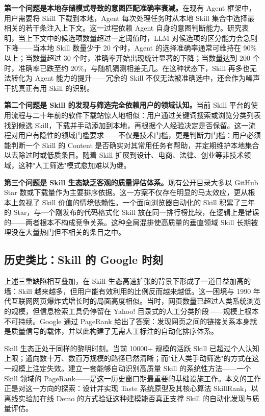 \textbf{第一个问题是本地存储模式导致的意图匹配准确率衰减。}在现有 Agent 框架中，用户需要将 Skill 下载到本地，Agent 每次处理任务时从本地 Skill 集合中选择最相关的若干条注入上下文。这一过程依赖 Agent 自身的意图判断能力。研究表明\cite{liu2024lostinthemiddle}，当上下文中的候选项数量超过一定阈值时，LLM 对候选项的区分能力会急剧下降——当本地 Skill 数量少于 20 个时，Agent 的选择准确率通常可维持在 90\% 以上；当数量超过 30 个时，准确率开始出现统计显著的下降；当数量达到 200 个时，准确率已跌至约 20\%，与随机猜测相差无几。在这种状态下，Skill 再多也无法转化为 Agent 能力的提升——冗余的 Skill 不仅无法被准确选中，还会作为噪声干扰真正有用 Skill 的识别。

\textbf{第二个问题是 Skill 的发现与筛选完全依赖用户的领域认知。}当前 Skill 平台的使用流程与二十年前的软件下载站惊人地相似：用户通过关键词搜索或浏览分类列表找到候选 Skill，下载并手动添加到本地，再根据个人经验决定是否保留。这一流程对用户有隐性的领域门槛要求——不仅是技术门槛，更是判断力门槛：用户必须能判断一个 Skill 的 Content 是否确实对其常用任务有帮助，并定期维护本地集合以去除过时或低质条目。随着 Skill 扩展到设计、电商、法律、创业等非技术领域，这种"人工筛选"模式愈加难以为继。

\textbf{第三个问题是 Skill 生态缺乏客观的质量评估体系。}现有公开目录大多以 GitHub Star 数或下载量作为主要排序依据。这一方案不仅存在明显的马太效应，更从根本上忽视了 Skill 价值的情境依赖性。一个面向浏览器自动化的 Skill 积累了三年的 Star，与一个刚发布的代码格式化 Skill 放在同一排行榜比较，在逻辑上是错误的——两者根本不构成竞争关系。这种全局混排使高质量的垂直领域 Skill 长期被埋没在大量热门但不相关的条目之中。

\subsection{历史类比：Skill 的 Google 时刻}

上述三重缺陷相互叠加，在 Skill 生态高速扩张的背景下形成了一道日益加高的墙：Skill 越来越多，但用户能有效利用的比例反而越来越低。这一困境与 1990 年代互联网网页爆炸式增长时的局面高度相似。当时，网页数量已超过人类系统浏览的规模，但信息检索工具仍停留在 Yahoo! 目录式的人工分类阶段——规模上根本不可持续。Google 通过 PageRank\cite{brin1998anatomy,page1999pagerank} 给出了答案：发现网页之间的链接关系本身就是质量信号的载体，并以此构建了无需人工标注的自动化排序体系。

Skill 生态正处于同样的黎明时刻。当前 10000+ 规模的活跃 Skill 已超过个人认知上限；通向数十万、数百万规模的路径已然清晰；而"让人类手动筛选"的方式在这一规模上注定失效。建立一套能够自动识别高质量 Skill 的系统性方法——一个 Skill 领域的 PageRank——是这一历史窗口期最重要的基础设施工作。本文的工作正是对这一方向的探索：设计并实现 Taste 系统原型及其核心算法 SkillRank，以离线实验加在线 Demo 的方式验证这种建模能否真正支撑 Skill 的自动化发现与质量评估。


